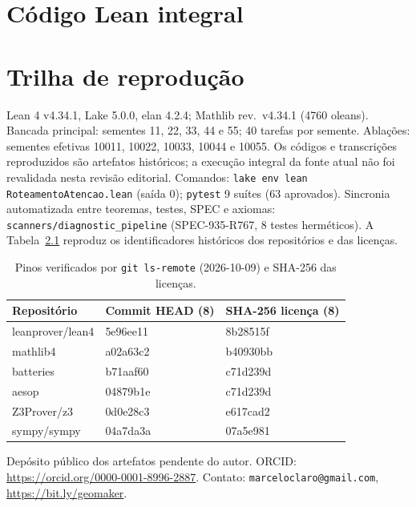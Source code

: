 \apendices
\chapter{Código Lean integral}
\label{ap:lean}

\chapter{Trilha de reprodução}
\label{ap:reproducao}
Lean 4 v4.34.1, Lake 5.0.0, elan 4.2.4; Mathlib rev.\ v4.34.1 (4760 oleans). Bancada principal: sementes 11, 22, 33, 44 e 55; 40 tarefas por semente. Ablações: sementes efetivas 10011, 10022, 10033, 10044 e 10055. Os códigos e transcrições reproduzidos são artefatos históricos; a execução integral da fonte atual não foi revalidada nesta revisão editorial. Comandos: \nolinkurl{lake env lean RoteamentoAtencao.lean} (saída 0); \texttt{pytest} 9 suítes (63 aprovados). Sincronia automatizada entre teoremas, testes, SPEC e axiomas: \nolinkurl{scanners/diagnostic_pipeline} (SPEC-935-R767, 8 testes herméticos).
A Tabela~\ref{tab:pins} reproduz os identificadores históricos dos repositórios e das licenças.
\begin{table}[htbp]
\fontsize{10}{12}\selectfont\SingleSpacing
\centering
\caption{Pinos verificados por \texttt{git ls-remote} (2026-10-09) e SHA-256 das licenças.}
\label{tab:pins}
\begin{tabularx}{\textwidth}{lXX}
\toprule
Repositório & Commit HEAD (8) & SHA-256 licença (8) \\
\midrule
leanprover/lean4 & 5e96ee11 & 8b28515f \\
mathlib4 & a02a63c2 & b40930bb \\
batteries & b71aaf60 & c71d239d \\
aesop & 04879b1e & c71d239d \\
Z3Prover/z3 & 0d0e28c3 & e617cad2 \\
sympy/sympy & 04a7da3a & 07a5e981 \\
\bottomrule
\end{tabularx}
\end{table}
Depósito público dos artefatos pendente do autor. ORCID: \url{https://orcid.org/0000-0001-8996-2887}. Contato: \texttt{marceloclaro@gmail.com}, \url{https://bit.ly/geomaker}.
